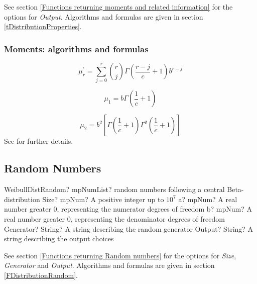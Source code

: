\vspace{0.3cm}

See section \ref{Functions returning moments and related information} for the options for {\itshape\sffamily Output}. Algorithms and formulas are given in section \ref{tDistributionProperties}.



\subsubsection{Moments: algorithms and formulas}

\begin{equation} 
	\mu_r^{'} = \sum_{j=0}^r \binom{r}{j} \Gamma\left(\frac{r-j}{c}+1 \right) b^{r-j}
\end{equation}

\begin{equation} 
	\mu_1 = b \Gamma\left(\frac{1}{c}+1 \right) 
\end{equation}

\begin{equation} 
	\mu_2 = b^2 \left[ \Gamma\left(\frac{1}{c}+1\right) \Gamma^2\left(\frac{1}{c}+1\right)  \right]
\end{equation}
See \cite{Rinne_book_2008} for further details.

\subsection{Random Numbers}

\begin{mpFunctionsExtract}
	\mpFunctionFiveNotImplemented
	{WeibullDistRandom? mpNumList? random numbers following a central Beta-distribution}
	{Size? mpNum? A positive integer up to $10^7$}
	{a? mpNum? A real number greater 0, representing the numerator  degrees of freedom}
	{b? mpNum? A real number greater 0, representing the denominator degrees of freedom}
	{Generator? String? A string describing the random generator}
	{Output? String? A string describing the output choices}
\end{mpFunctionsExtract}

\vspace{0.3cm}

See section \ref{Functions returning Random numbers} for the options for  {\itshape\sffamily Size},  {\itshape\sffamily Generator} and {\itshape\sffamily Output}. Algorithms and formulas are given in section \ref{FDistributionRandom}.



